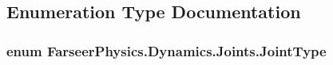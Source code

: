 \subsection{Enumeration Type Documentation}
\hypertarget{namespace_farseer_physics_1_1_dynamics_1_1_joints_a9cdf2fbf2838f915432565f0d0953749}{
\subsubsection[{Joint\+Type}]{\setlength{\rightskip}{0pt plus 5cm}enum {\bf Farseer\+Physics.\+Dynamics.\+Joints.\+Joint\+Type}}}\label{namespace_farseer_physics_1_1_dynamics_1_1_joints_a9cdf2fbf2838f915432565f0d0953749}
